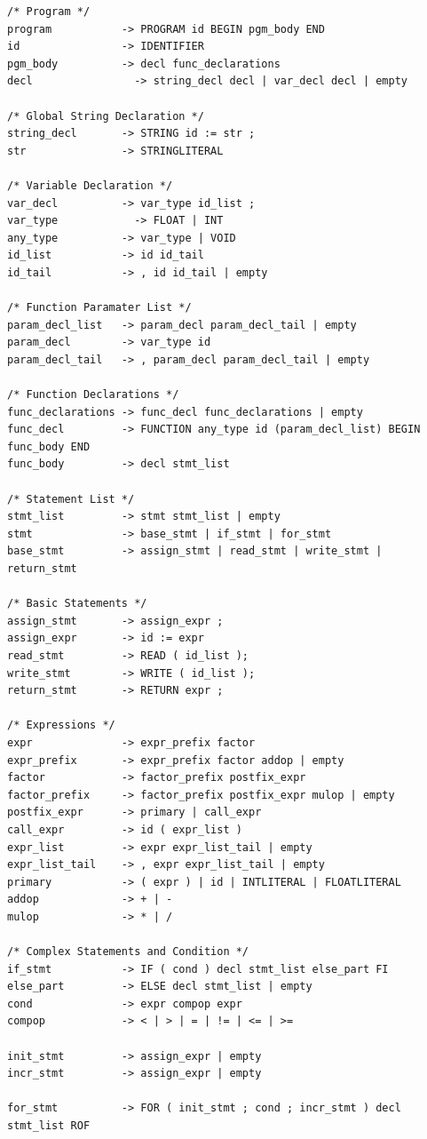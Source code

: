 \documentclass{article}
\begin{document}
\begin{lstlisting}[numbers=none]
/* Program */
program           -> PROGRAM id BEGIN pgm_body END 
id                -> IDENTIFIER
pgm_body          -> decl func_declarations
decl                -> string_decl decl | var_decl decl | empty

/* Global String Declaration */
string_decl       -> STRING id := str ;
str               -> STRINGLITERAL

/* Variable Declaration */
var_decl          -> var_type id_list ;
var_type            -> FLOAT | INT
any_type          -> var_type | VOID 
id_list           -> id id_tail
id_tail           -> , id id_tail | empty

/* Function Paramater List */
param_decl_list   -> param_decl param_decl_tail | empty
param_decl        -> var_type id
param_decl_tail   -> , param_decl param_decl_tail | empty

/* Function Declarations */
func_declarations -> func_decl func_declarations | empty
func_decl         -> FUNCTION any_type id (param_decl_list) BEGIN func_body END
func_body         -> decl stmt_list 

/* Statement List */
stmt_list         -> stmt stmt_list | empty
stmt              -> base_stmt | if_stmt | for_stmt
base_stmt         -> assign_stmt | read_stmt | write_stmt | return_stmt

/* Basic Statements */
assign_stmt       -> assign_expr ;
assign_expr       -> id := expr
read_stmt         -> READ ( id_list );
write_stmt        -> WRITE ( id_list );
return_stmt       -> RETURN expr ;

/* Expressions */
expr              -> expr_prefix factor
expr_prefix       -> expr_prefix factor addop | empty
factor            -> factor_prefix postfix_expr
factor_prefix     -> factor_prefix postfix_expr mulop | empty
postfix_expr      -> primary | call_expr
call_expr         -> id ( expr_list )
expr_list         -> expr expr_list_tail | empty
expr_list_tail    -> , expr expr_list_tail | empty
primary           -> ( expr ) | id | INTLITERAL | FLOATLITERAL
addop             -> + | -
mulop             -> * | /

/* Complex Statements and Condition */ 
if_stmt           -> IF ( cond ) decl stmt_list else_part FI
else_part         -> ELSE decl stmt_list | empty
cond              -> expr compop expr
compop            -> < | > | = | != | <= | >=

init_stmt         -> assign_expr | empty
incr_stmt         -> assign_expr | empty

for_stmt          -> FOR ( init_stmt ; cond ; incr_stmt ) decl stmt_list ROF
\end{lstlisting}
\end{document}
